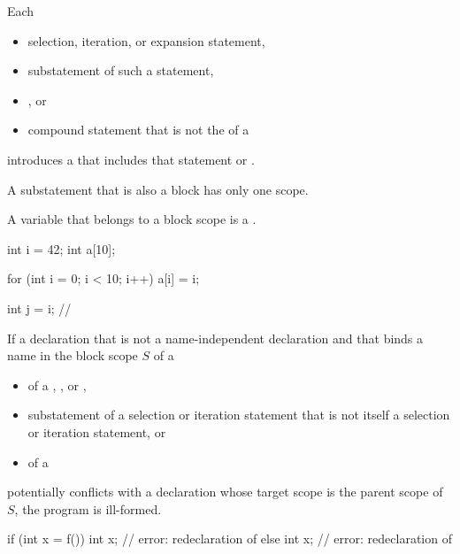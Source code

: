 %

\pnum
Each
\begin{itemize}
\item
selection, iteration, or expansion statement,
\item
substatement of such a statement,
\item
{}%
, or
\item
compound statement
that is not the  of a 
\end{itemize}
introduces a 
that includes that statement or .
\begin{note}
A substatement that is also a block has only one scope.
\end{note}
A variable that belongs to a block scope is a .
\begin{example}
\begin{codeblock}
int i = 42;
int a[10];

for (int i = 0; i < 10; i++)
  a[i] = i;

int j = i;          // 
\end{codeblock}
\end{example}

\pnum
If a declaration
that is not a name-independent declaration and
that binds a name in the block scope $S$ of a
\begin{itemize}
\item
{} of a ,
, or ,
\item
substatement of a selection or iteration statement
that is not itself a selection or iteration statement, or
\item
{} of a 
\end{itemize}
potentially conflicts with a declaration
whose target scope is the parent scope of $S$,
the program is ill-formed.
\begin{example}
\begin{codeblock}
if (int x = f()) {
  int x;            // error: redeclaration of 
}
else {
  int x;            // error: redeclaration of 
}
\end{codeblock}
\end{example}

